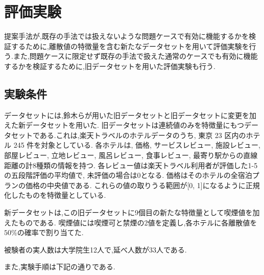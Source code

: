 \chapter{評価実験}
\hspace{1em}提案手法が,既存の手法では扱えないような問題ケースで有効に機能するかを検証するために,離散値の特徴量を含む新たなデータセットを用いて評価実験を行う.また,問題ケースに限定せず既存の手法で扱えた通常のケースでも有効に機能するかを検証するために,旧データセットを用いた評価実験も行う.
\section{実験条件}
データセットには,鈴木らが用いた旧データセットと旧データセットに変更を加えた新データセットを用いた.
旧データセットは連続値のみを特徴量にもつデータセットである.これは,楽天トラベルのホテルデータのうち, 東京 23 区内のホテル 245 件を対象としている.
各ホテルは, 価格, サービスレビュー, 施設レビュー, 部屋レビュー, 立地レビュー, 風呂レビュー, 食事レビュー, 最寄り駅からの直線距離の計8種類の情報を持つ.
各レビュー値は楽天トラベル利用者が評価した1-5の五段階評価の平均値で, 未評価の場合は0となる.
価格はそのホテルの全宿泊プランの価格の中央値である.
これらの値の取りうる範囲が[0, 1]になるように正規化したものを特徴量としている.\par
新データセットは,この旧データセットに9個目の新たな特徴量として喫煙値を加えたものである.
喫煙値には喫煙可と禁煙の2値を定義し,各ホテルに各離散値を$50\%$の確率で割り当てた.
\par
被験者の実人数は大学院生12人で,延べ人数が33人である.
\par
また,実験手順は下記の通りである.

